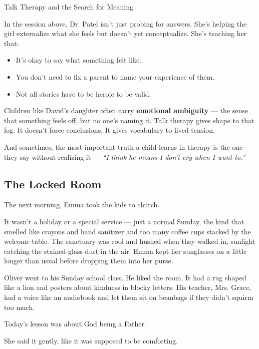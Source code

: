 \begin{PsychologicalSidebar}{Talk Therapy and the Search for Meaning}
    \medskip
    
    In the session above, Dr. Patel isn’t just probing for answers. She’s helping the girl externalize 
    what she feels but doesn’t yet conceptualize.  
    She’s teaching her that:
    
    \begin{itemize}
      \item It’s okay to say what something felt like.
      \item You don’t need to fix a parent to name your experience of them.
      \item Not all stories have to be heroic to be valid.
    \end{itemize}
    
    \medskip
    
    Children like David’s daughter often carry \textbf{emotional ambiguity} — the sense that something feels 
    off, but no one’s naming it. Talk therapy gives shape to that fog. It doesn’t force conclusions. It 
    gives vocabulary to lived tension.
    
    And sometimes, the most important truth a child learns in therapy is the one they say without realizing 
    it —  \textit{``I think he means I don’t cry when I want to.''}
    
\end{PsychologicalSidebar}
   

\subsection{The Locked Room}

The next morning, Emma took the kids to church.

It wasn’t a holiday or a special service — just a normal Sunday, the kind that smelled like crayons and 
hand sanitizer and too many coffee cups stacked by the welcome table. The sanctuary was cool and hushed 
when they walked in, sunlight catching the stained-glass dust in the air. Emma kept her sunglasses on 
a little longer than usual before dropping them into her purse.

Oliver went to his Sunday school class. He liked the room. It had a rug shaped like a lion and posters 
about kindness in blocky letters. His teacher, Mrs. Grace, had a voice like an audiobook and let them 
sit on beanbags if they didn’t squirm too much.

Today’s lesson was about God being a Father.

She said it gently, like it was supposed to be comforting.

